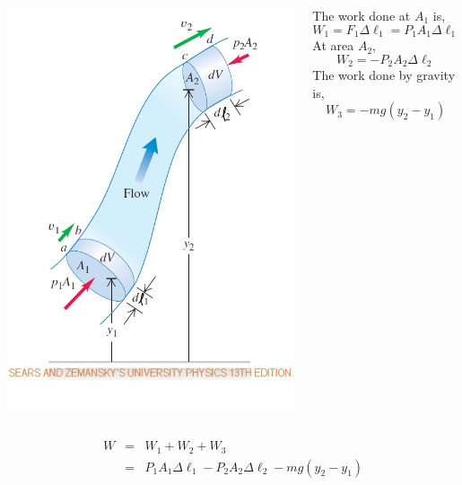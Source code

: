 \documentclass[]{beamer}
\begin{document}
\begin{frame}


   \begin{columns}[c]
   \column{1.8in}  %
  

  \begin{center}
  \includegraphics[height=3.in]{images2/Bernoulli_SZ.jpg}
\end{center}



   \column{2.2in}


The work done at $A_1$ is,
\begin{equation}
W_1=F_1\Delta \ell_1=P_1 A_1 \Delta \ell_1
\end{equation}
\pause
At area $A_2$, 
\pause
\begin{equation}
W_2=-P_2 A_2 \Delta \ell_2
\end{equation}
\pause
The work done by gravity is,
\pause
\begin{equation}
W_3=-mg(y_2-y_1)
\end{equation}





   \end{columns}

\pause
\begin{eqnarray*}
W&=&W_1+W_2+W_3\\
&=&P_1A_1\Delta \ell_1-P_2 A_2 \Delta \ell_2-mg(y_2-y_1)\\
\end{eqnarray*}



  \end{frame}


\end{document}
